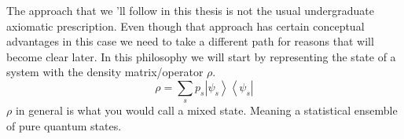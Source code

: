 The approach that we 'll follow in this thesis is not the usual undergraduate axiomatic prescription. Even though that approach has certain conceptual advantages in this case we need to take a different path for reasons that will become clear later. In this philosophy we will start by representing the state of a system with the density matrix/operator $\rho$.
\begin{equation}\rho=\sum_{s} p_{s}\left|\psi_{s}\right\rangle\left\langle\psi_{s}\right|\end{equation}
$\rho$ in general is what you would call a mixed state. Meaning a statistical ensemble of pure quantum states.